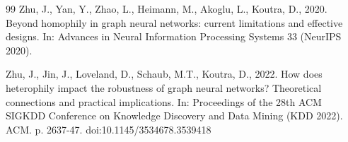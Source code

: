 \documentclass[onecolumn,pdflatex,sn-basic,Numbered]{sn-jnl}
\theoremstyle{thmstyleone}
\theoremstyle{thmstylethree}
\begin{document}
\begin{thebibliography}{99}
Zhu, J., Yan, Y., Zhao, L., Heimann, M., Akoglu, L., Koutra, D., 2020. Beyond homophily in graph neural networks: current limitations and effective designs. In: Advances in Neural Information Processing Systems 33 (NeurIPS 2020).

Zhu, J., Jin, J., Loveland, D., Schaub, M.T., Koutra, D., 2022. How does heterophily impact the robustness of graph neural networks? Theoretical connections and practical implications. In: Proceedings of the 28th ACM SIGKDD Conference on Knowledge Discovery and Data Mining (KDD 2022). ACM. p. 2637-47. doi:10.1145/3534678.3539418

\end{thebibliography}
\end{document}
